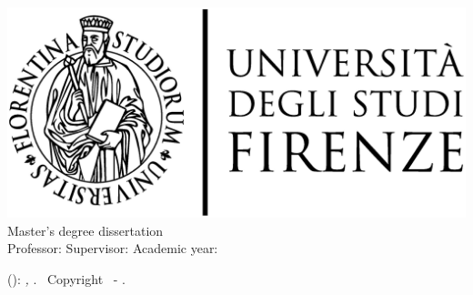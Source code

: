 \begin{titlepage}
	\begin{center}
   	\large
      \hfill
      \vfill
      \begingroup
			\spacedallcaps{\myUni} \\ 
			\myFaculty \\
			\myDegree \\ 
			\vspace{0.5cm}
         \includegraphics[width=.5\textwidth]{logo/logoUnifiName.eps}\\
         \vspace{0.5cm}    
         Master's degree dissertation   
      \endgroup 
      \vfill 
      \begingroup
      	\color{Maroon}\spacedallcaps{\myTitle} \\ \bigskip
      \endgroup
      \spacedlowsmallcaps{\myName}
      \vfill  
      Professor: {\itshape\myProf}
      \vfill
      Supervisor: {\itshape\mySupervisor}
      \vfill
      Academic year: {\itshape\myAcademicYear}
      \vfill                      
	\end{center}        
\end{titlepage}   
   \newpage
	\thispagestyle{empty}
	\hfill
	\vfill
	\noindent\myName(\texttt{\myMail}): 
	\textit{\myTitle,} 
	\myDegree. \textcopyright\ Copyright \myYear \myName\ - \mycopyright.
